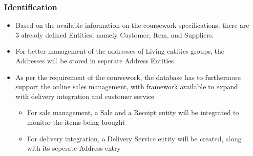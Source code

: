 \documentclass[11pt]{article}
\begin{document}
\subsubsection{Identification}
\label{sec:org9316b94}
\begin{itemize}
\item Based on the available information on the coursework specifications, there are 3 already defined Entities, namely Customer, Item, and Suppliers.
\item For better management of the addresses of Living entities groups, the Addresses will be stored in seperate Address Entities
\item As per the requirement of the coursework, the database has to furthermore support the online sales management, with
framework available to expand with delivery integration and customer service
\begin{itemize}
\item For sale management, a Sale and a Receipt entity will be integrated to monitor the items being brought
\item For delivery integration, a Delivery Service entity will be created, along with its seperate Address entry
\end{itemize}
\end{itemize}
\end{document}
